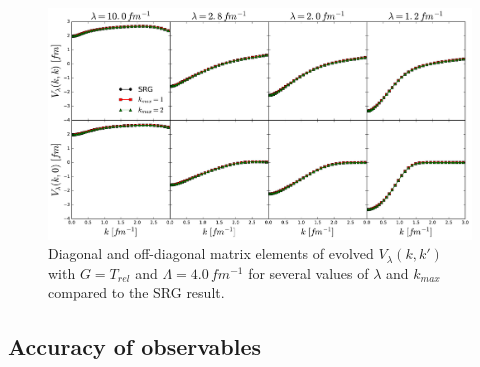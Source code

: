 \documentclass[preprintnumbers,floatfix,aps,prc,preprint]{revtex4-1}
\begin{document}
%
\begin{figure}[H]
  \centering
  \includegraphics[width=15cm]{mag_diags_offdiags_Wendt_4_Wilson}
   \hspace*{0.05\textwidth}%
  \caption{Diagonal and off-diagonal matrix elements of evolved $V_{\lambda}(k,k')$ with $G=T_{rel}$ and $\Lambda=4.0 \, fm^{-1}$ for several values of $\lambda$ and $k_{max}$ compared to the SRG result.}
  \label{fig:mag_diags_offdiags_Wendt_4_Wilson}
\end{figure}

\subsection{Accuracy of observables}
\end{document}
